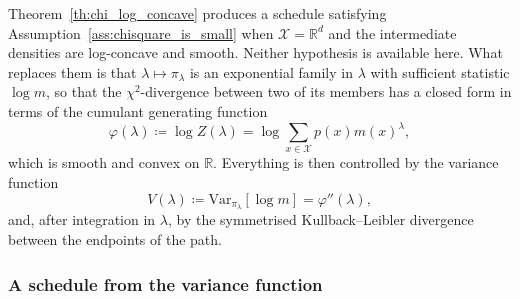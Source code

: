 \documentclass[aos]{imsart}%
\newcommand{\ambientspace}[0]{\mathcal{X}}
\newcommand{\bbR}[0]{\mathbb{R}}
\newcommand{\Var}{\mathrm{Var}}
\theoremstyle{plain}
\theoremstyle{definition}
\begin{document}
    Theorem~\ref{th:chi_log_concave} produces a schedule
    satisfying Assumption~\ref{ass:chisquare_is_small} when
    $\ambientspace=\bbR^{d}$ and the intermediate densities are log-concave and
    smooth. Neither hypothesis is available here. What replaces them is that
    $\lambda\mapsto\pi_\lambda$ is an exponential family in $\lambda$ with
    sufficient statistic $\log m$, so that the $\chi^{2}$-divergence between two
    of its members has a closed form in terms of the cumulant generating
    function
    \begin{equation}
        \label{eq:binary_psi_cgf}
        \varphi(\lambda)\coloneq\log Z(\lambda)
        =\log\sum_{x\in\ambientspace}p(x)m(x)^{\lambda},
    \end{equation}
    which is smooth and convex on $\bbR$. Everything is then controlled by the
    variance function
    \begin{equation}
        \label{eq:binary_V}
        V(\lambda)\coloneq\Var_{\pi_\lambda}[\log m]=\varphi''(\lambda),
    \end{equation}
    and, after integration in $\lambda$, by the symmetrised
    Kullback--Leibler divergence between the endpoints of the path.

    \subsubsection{A schedule from the variance function}
\end{document}

